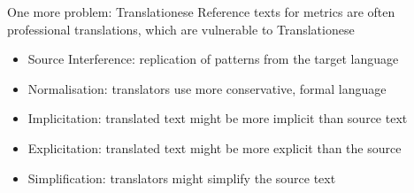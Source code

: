 \begin{vbframe}{One more problem: Translationese}
	\vfill
	Reference texts for metrics are often professional translations, which are vulnerable to Translationese
	\begin{itemize}
		\item Source Interference: replication of patterns from the target language
		\item Normalisation: translators use more conservative, formal language
		\item Implicitation: translated text might be more implicit than source text
		\item Explicitation: translated text might be more explicit than the source
		\item Simplification: translators might simplify the source text

	\end{itemize}
	\vfill
\end{vbframe}


\endlecture

